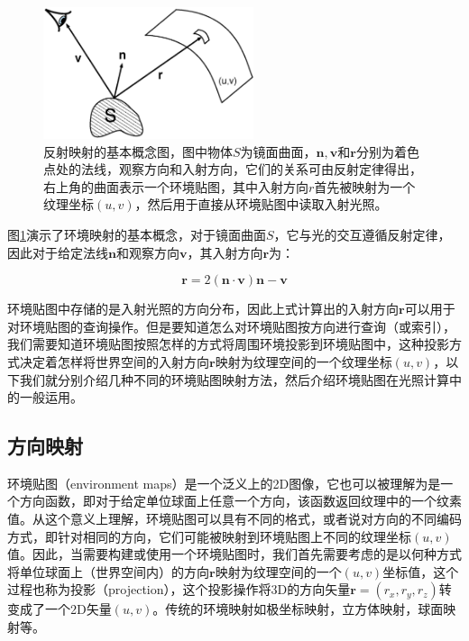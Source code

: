 \begin{figure}
	\sidecaption
	\includegraphics[width=0.55\textwidth]{figures/pl/environment-mapping}
	\caption{反射映射的基本概念图，图中物体$S$为镜面曲面，$\mathbf{n},\mathbf{v}$和$\mathbf{r}$分别为着色点处的法线，观察方向和入射方向，它们的关系可由反射定律得出，右上角的曲面表示一个环境贴图，其中入射方向$r$首先被映射为一个纹理坐标$(u,v)$，然后用于直接从环境贴图中读取入射光照。}
	\label{f:pl-environment-mappling}
\end{figure}

图\ref{f:pl-environment-mappling}演示了环境映射的基本概念，对于镜面曲面$S$，它与光的交互遵循反射定律，因此对于给定法线$\mathbf{n}$和观察方向$\mathbf{v}$，其入射方向$\mathbf{r}$为：

\begin{equation}
\mathbf{r}=2(\mathbf{n}\cdot\mathbf{v})\mathbf{n}-\mathbf{v}
\end{equation}

环境贴图中存储的是入射光照的方向分布，因此上式计算出的入射方向$\mathbf{r}$可以用于对环境贴图的查询操作。但是要知道怎么对环境贴图按方向进行查询（或索引），我们需要知道环境贴图按照怎样的方式将周围环境投影到环境贴图中，这种投影方式决定着怎样将世界空间的入射方向$\mathbf{r}$映射为纹理空间的一个纹理坐标$(u,v)$，以下我们就分别介绍几种不同的环境贴图映射方法，然后介绍环境贴图在光照计算中的一般运用。



\subsection{方向映射}
环境贴图（environment maps）是一个泛义上的2D图像，它也可以被理解为是一个方向函数，即对于给定单位球面上任意一个方向，该函数返回纹理中的一个纹素值。从这个意义上理解，环境贴图可以具有不同的格式，或者说对方向的不同编码方式，即针对相同的方向，它们可能被映射到环境贴图上不同的纹理坐标$(u,v)$值。因此，当需要构建或使用一个环境贴图时，我们首先需要考虑的是以何种方式将单位球面上（世界空间内）的方向$\mathbf{r}$映射为纹理空间的一个$(u,v)$坐标值，这个过程也称为投影（projection），这个投影操作将3D的方向矢量$\mathbf{r}=(r_x,r_y,r_z)$转变成了一个2D矢量$(u,v)$。传统的环境映射如极坐标映射，立方体映射，球面映射等。

